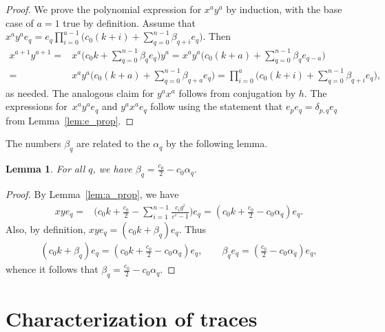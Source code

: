 \documentclass[pdftex]{sigma}
\newcommand\eps{\varepsilon}
\numberwithin{equation}{section}
\newtheorem{Lemma}[Theorem]{Lemma}
\theoremstyle{definition}
\begin{document}
\begin{proof}
 We prove the polynomial expression for $x^a y^a$
 by induction,
 with the base case of $a = 1$ true by definition.
 Assume that
 $x^a y^a e_q = e_q \prod_{i = 0}^{a - 1}
 \bigl(c_0 (k + i) + \sum_{q = 0}^{n - 1} \beta_{q + i} e_q\bigr)$.
 Then
 \begin{align*}
 x^{a + 1} y^{a + 1}
 ={}& x^a \Bigg( c_0 k
 + \sum\limits_{q = 0}^{n - 1}
 \beta_q e_q \Bigg) y^a = x^a y^a \Bigg( c_0 (k + a)
 + \sum\limits_{q = 0}^{n - 1}
 \beta_q e_{q - a} \Bigg) \\
 ={}& x^a y^a \Bigg( c_0 (k + a)
 + \sum\limits_{q = 0}^{n - 1}
 \beta_{q + a} e_q \Bigg) = \prod\limits_{i = 0}^a
 \Bigg( c_0 (k + i)
 + \sum\limits_{q = 0}^{n - 1}
 \beta_{q + i} e_q \Bigg),
 \end{align*}
 as needed.
 The analogous claim for $y^a x^a$
 follows from conjugation by $h$.
 The expressions for~$x^a y^a e_q$ and $y^a x^a e_q$
 follow using the statement that $e_p e_q = \delta_{p, q} e_q$
 from Lemma~\ref{lem:e_prop}.
\end{proof}

The numbers $\beta_q$ are related to the $\alpha_q$
by the following lemma.

\begin{Lemma}
 \label{lem:a_b_rel}
 For all $q$, we have $\beta_q = \frac{c_0}{2} - c_0 \alpha_q$.
\end{Lemma}

\begin{proof}
 By Lemma~\ref{lem:a_prop}, we have
 \begin{align*}
 xy e_q ={}& \Bigg( c_0 k + \frac{c_0}{2}
 - \sum\limits_{i = 1}^{n - 1}
 \frac{c_i g^i}{\eps^i - 1} \Bigg) e_q = \left( c_0k + \frac{c_0}{2} - c_0 \alpha_q \right) e_q.
 \end{align*}
 Also, by definition,
 $xy e_q = ( c_0 k + \beta_q ) e_q$.
 Thus
 \begin{align*}
 \left( c_0 k + \beta_q \right) e_q
 = \left( c_0 k + \frac{c_0}{2}
 - c_0 \alpha_q \right) e_q ,\qquad
 \beta_q e_q
 = \left( \frac{c_0}{2}
 - c_0 \alpha_q \right) e_q,
 \end{align*}
 whence it follows that $\beta_q = \frac{c_0}{2} - c_0 \alpha_q$.
\end{proof}


\section{Characterization of traces}
\label{sec:trace_classif}
\end{document}
